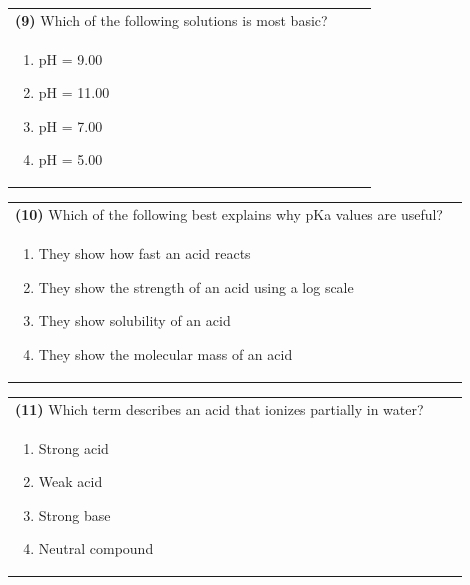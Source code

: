 \documentclass{article}
\begin{document}
\noindent\begin{tabular}{|p{0.9\linewidth}|}
\hline
\textbf{(9)} Which of the following solutions is most basic? \\[0.2cm]
\begin{minipage}{0.85\linewidth}
\begin{enumerate}[label=\alph*.]
\item pH = 9.00 \item pH = 11.00 \item pH = 7.00 \item pH = 5.00
\end{enumerate}
\end{minipage}\\[0.2cm]
\hline
\end{tabular}

\noindent\begin{tabular}{|p{0.9\linewidth}|}
\hline
\textbf{(10)} Which of the following best explains why pKa values are useful? \\[0.2cm]
\begin{minipage}{0.85\linewidth}
\begin{enumerate}[label=\alph*.]
\item They show how fast an acid reacts
\item They show the strength of an acid using a log scale
\item They show solubility of an acid
\item They show the molecular mass of an acid
\end{enumerate}
\end{minipage}\\[0.2cm]
\hline
\end{tabular}

\noindent\begin{tabular}{|p{0.9\linewidth}|}
\hline
\textbf{(11)} Which term describes an acid that ionizes partially in water? \\[0.2cm]
\begin{minipage}[t]{0.85\linewidth}
\begin{enumerate}[label=\alph*.]
\item Strong acid \item Weak acid \item Strong base \item Neutral compound
\end{enumerate}
\end{minipage}\\[0.2cm]
\hline
\end{tabular}
\end{document}
